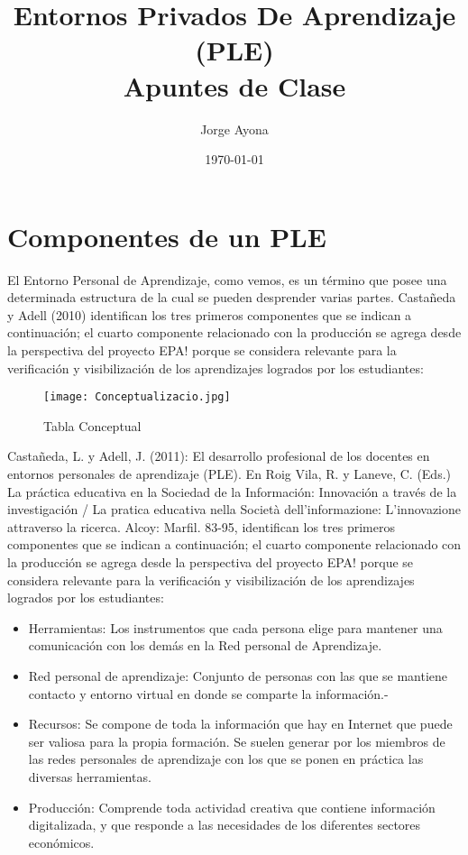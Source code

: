 \documentclass[a4paper12pt]{article}
\title{\vspace{5cm}Entornos Privados De Aprendizaje \\ (PLE) \\ Apuntes de Clase \vspace{2cm}}
\author{Jorge Ayona \\}
\date{\today}
\providecommand{\tightlist}{%
      \setlength{\itemsep}{0pt}\setlength{\parskip}{0pt}}
\begin{document}
	
	   
    
    \maketitle
    
    
\newpage
    
    \hypertarget{componentes-de-un-ple}{%
\section{Componentes de un PLE}\label{componentes-de-un-ple}}

El Entorno Personal de Aprendizaje, como vemos, es un término que posee
una determinada estructura de la cual se pueden desprender varias
partes. Castañeda y Adell (2010) identifican los tres primeros
componentes que se indican a continuación; el cuarto componente
relacionado con la producción se agrega desde la perspectiva del
proyecto EPA! porque se considera relevante para la verificación y
visibilización de los aprendizajes logrados por los estudiantes:

\begin{figure}
\centering
\texttt{[image: Conceptualizacio.jpg]}
\caption{Tabla Conceptual}
\end{figure}

    Castañeda, L. y Adell, J. (2011): El desarrollo profesional de los
docentes en entornos personales de aprendizaje (PLE). En Roig Vila, R. y
Laneve, C. (Eds.) La práctica educativa en la Sociedad de la
Información: Innovación a través de la investigación / La pratica
educativa nella Società dell'informazione: L'innovazione attraverso la
ricerca. Alcoy: Marfil. 83-95, identifican los tres primeros componentes
que se indican a continuación; el cuarto componente relacionado con la
producción se agrega desde la perspectiva del proyecto EPA! porque se
considera relevante para la verificación y visibilización de los
aprendizajes logrados por los estudiantes:

    \begin{itemize}
\tightlist
\item
  Herramientas: Los instrumentos que cada persona elige para mantener
  una comunicación con los demás en la Red personal de Aprendizaje.
\item
  Red personal de aprendizaje: Conjunto de personas con las que se
  mantiene contacto y entorno virtual en donde se comparte la
  información.-
\item
  Recursos: Se compone de toda la información que hay en Internet que
  puede ser valiosa para la propia formación. Se suelen generar por los
  miembros de las redes personales de aprendizaje con los que se ponen
  en práctica las diversas herramientas.
\item
  Producción: Comprende toda actividad creativa que contiene información
  digitalizada, y que responde a las necesidades de los diferentes
  sectores económicos.
\end{itemize}
\end{document}
